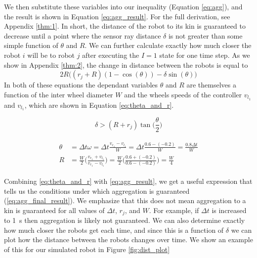 \documentclass[conference]{IEEEtran}
\begin{document}
  We then substitute these variables into our inequality (Equation \ref{eq:agg}), and the result is shown in Equation \ref{eq:agg_result}. For the full derivation, see Appendix \ref{thm:1}. In short, the distance of the robot to its kin is guaranteed to decrease until a point where the sensor ray distance $\delta$ is not greater than some simple function of $\theta$ and $R$. We can further calculate exactly how much closer the robot $i$ will be to robot $j$ after executing the $I=1$ state for one time step. As we show in Appendix \ref{thm:2}, the change in distance between the robots is equal to
  $$2R\big((r_j + R)(1 - \cos(\theta))-\delta\sin(\theta)\big)$$
  In both of these equations the dependant variables $\theta$ and $R$ are themselves a function of the inter wheel diameter $W$ and the wheels speeds of the controller $v_{l_1}$ and $v_{l_1}$, which are shown in Equation \ref{eq:theta_and_r}.

  \begin{equation} \label{eq:agg_result}
    \delta > (R + r_j)\tan\bigg(\frac{\theta}{2}\bigg)
  \end{equation}

  \begin{align}
    \begin{split} \label{eq:theta_and_r}
      \theta &= \Delta t\omega = \Delta t \frac{v_{r_1} - v_{l_1}}{W} = \Delta t \frac{0.6 - (-0.2)}{W} = \frac{0.8\Delta t}{W} \\
      R &= \frac{W}{2}\bigg(\frac{v_{r_1} + v_{l_1}}{v_{r_1} - v_{l_1}}\bigg) = \frac{W}{2}\bigg(\frac{0.6 + (-0.2)}{0.6 - (-0.2)}\bigg) = \frac{W}{4}
    \end{split}
  \end{align}

  Combining \ref{eq:theta_and_r} with \ref{eq:agg_result}, we get a useful expression that tells us the conditions under which aggregation is guaranteed (\ref{eq:agg_final_result}). We emphasize that this does not mean aggregation to a kin is guaranteed for all values of $\Delta t$, $r_j$, and $W$. For example, if $\Delta t$ is increased to \SI{1}{\second} then aggregation is likely not guaranteed. We can also determine exactly how much closer the robots get each time, and since this is a function of $\delta$ we can plot how the distance between the robots changes over time. We show an example of this for our simulated robot in Figure \ref{fig:dist_plot}
\end{document}

